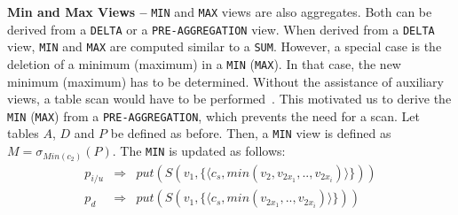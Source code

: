  
\noindent  
\textbf{Min and Max Views --} \texttt{MIN} and \texttt{MAX} views are
also aggregates. Both can be derived from a \texttt{DELTA} or a
\texttt{PRE-AGGREGATION} view. When derived from a \texttt{DELTA}
view, \texttt{MIN} and \texttt{MAX} are computed similar to a
\texttt{SUM}. However, a special case is the deletion of a minimum
(maximum) in a \texttt{MIN} (\texttt{MAX}). In that case, the new
minimum (maximum) has to be determined. Without the assistance of
auxiliary views, a table scan would have to be
performed~\cite{jacobsen:viewmaintenance}. This motivated us to derive
the \texttt{MIN} (\texttt{MAX}) from a \texttt{PRE-AGGREGATION}, which
prevents the need for a scan.  Let tables $A$, $D$ and $P$ be defined
as before.  Then, a \texttt{MIN} view is defined as
$M=\sigma_{Min(c_2)} (P)$. The \texttt{MIN} is updated as follows:
%
\begin{eqnarray}
	p_{i/u} & \Rightarrow& put(S(v_1,\{\langle c_s, min(v_2, v_{2x_1},..,v_{2x_i})\rangle\}))\\
	p_d & \Rightarrow& put(S(v_1,\{\langle c_s, min(v_{2x_1},..,v_{2x_i})\rangle\}))
\end{eqnarray}

